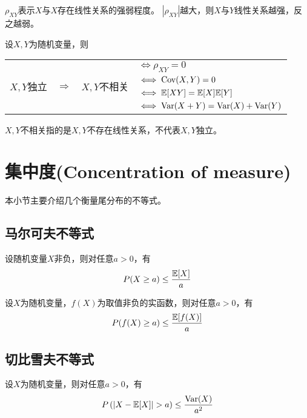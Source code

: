 \begin{remark}
  $\rho_{XY}$表示$X$与$X$存在线性关系的强弱程度。
  $|\rho_{XY}|$越大，则$X$与$Y$线性关系越强，反之越弱。
\end{remark}

\begin{theorem}[独立与不相关]
  设$X,Y$为随机变量，则
  \begin{center}
    \begin{tabular}{cccl}
      \multirow{4}{*}{$X,Y$独立} &
      \multirow{4}{*}{$\Longrightarrow$} &
      \multirow{4}{*}{$X,Y$不相关} &
      $\iff \rho_{XY}=0$ \\ 
      & & & $\iff \textrm{Cov}(X,Y)=0$ \\ 
      & & & $\iff \mathbb{E}[XY]=\mathbb{E}[X]\mathbb{E}[Y]$ \\ 
      & & & $\iff \textrm{Var}(X+Y)=\textrm{Var}(X)+\textrm{Var}(Y)$ \\ 
    \end{tabular} 
  \end{center}
\end{theorem}

\begin{remark}
  $X,Y$不相关指的是$X,Y$不存在线性关系，不代表$X,Y$独立。
\end{remark}

\section{集中度(Concentration of measure)}
本小节主要介绍几个衡量尾分布的不等式。

\subsection{马尔可夫不等式}
\begin{theorem}[马尔科夫不等式]
  设随机变量$X$非负，则对任意$a>0$，有
  \begin{displaymath}
    P(X\ge a) \le \frac{\mathbb{E}[X]}{a}
  \end{displaymath}
\end{theorem}

\begin{theorem}[马尔科夫不等式的推广]
  设$X$为随机变量，$f(X)$为取值非负的实函数，则对任意$a>0$，有
  \begin{displaymath}
    P(f(X)\ge a) \le \frac{\mathbb{E}[f(X)]}{a}
  \end{displaymath}
\end{theorem}

\subsection{切比雪夫不等式}
\begin{theorem}[切比雪夫不等式]
  设$X$为随机变量，则对任意$a>0$，有
  \begin{displaymath}
    P\left(|X-\mexpect[X]|>a\right) \le \frac{\mvar(X)}{a^2}
  \end{displaymath}
\end{theorem}